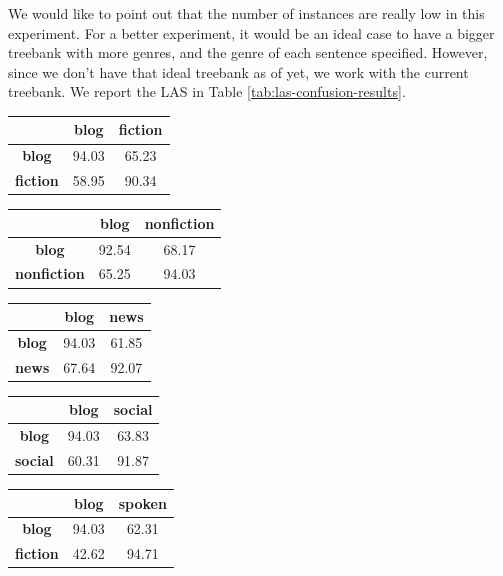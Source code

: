 We would like to point out that the number of instances are really low in this experiment. For a better experiment, it would be an ideal case to have a bigger treebank with more genres, and the genre of each sentence specified. However, since we don't have that ideal treebank as of yet, we work with the current treebank. We report the LAS in Table \ref{tab:las-confusion-results}.


\begin{table}[H]
    \centering
    \begin{tabular}{|c|c|c|}
    \hline
         & \textbf{blog} & \textbf{fiction} \\
    \hline
    \textbf{blog} & 94.03 & 65.23 \\
    \textbf{fiction} & 58.95 & 90.34 \\
    \hline
    \end{tabular}%
    \vspace{5mm}
    \begin{tabular}{|c|c|c|}
    \hline
         & \textbf{blog} & \textbf{nonfiction} \\
    \hline
    \textbf{blog} & 92.54 & 68.17 \\
    \textbf{nonfiction} & 65.25 & 94.03 \\
    \hline
    \end{tabular}%
    \vspace{5mm}
    \begin{tabular}{|c|c|c|}
    \hline
         & \textbf{blog} & \textbf{news} \\
    \hline
    \textbf{blog} & 94.03 & 61.85 \\
    \textbf{news} & 67.64 & 92.07 \\
    \hline
    \end{tabular}%
    \vspace{5mm}
    \begin{tabular}{|c|c|c|}
    \hline
         & \textbf{blog} & \textbf{social} \\
    \hline
    \textbf{blog} & 94.03 & 63.83 \\
    \textbf{social} & 60.31 & 91.87 \\
    \hline
    \end{tabular}%
    \vspace{5mm}
    \begin{tabular}{|c|c|c|}
    \hline
         & \textbf{blog} & \textbf{spoken} \\
    \hline
    \textbf{blog} & 94.03 & 62.31 \\
    \textbf{fiction} & 42.62 & 94.71 \\

\end{tabular}
\end{table}
